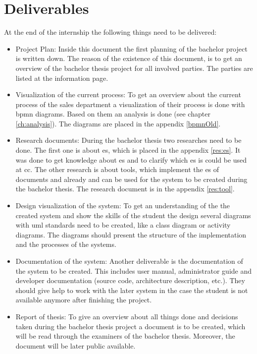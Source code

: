 \section{Deliverables}
At the end of the internship the following things need to be delivered:
\begin{itemize}
	\item Project Plan: Inside this document the first planning of the bachelor project is written down. The reason of the existence of this document, is to get an overview of the bachelor thesis project for all involved parties. The parties are listed at the information page.
	\item Visualization of the current process: To get an overview about the current process of the sales department a visualization of their process is done with \gls{bpmn} diagrams. Based on them an analysis is done (see chapter \ref{ch:analysis}). The diagrams are placed in the appendix \ref{bpmnOld}.
	\item Research documents: During the bachelor thesis two researches need to be done. The first one is about \gls{es}, which is placed in the appendix \ref{res:es}. It was done to get knowledge about \gls{es} and to clarify which \gls{es} is could be used at \gls{cc}. The other research is about tools, which implement the \gls{es} of documents and already and can be used for the system to be created during the bachelor thesis. The research document is in the appendix \ref{res:tool}.
	\item Design visualization of the system: To get an understanding of the the created system and show the skills of the student the design several diagrams with \gls{uml} standards need to be created, like a class diagram or activity diagrams. The diagrams should present the structure of the implementation and the processes of the systems.
	\item Documentation of the system: Another deliverable is the documentation of the system to be created. This includes user manual, administrator guide and developer documentation (source code, architecture description, etc.). They should give help to work with the later system in the case the student is not available anymore after finishing the project.
	\item Report of thesis: To give an overview about all things done and decisions taken during the bachelor thesis project a document is to be created, which will be read through the examiners of the bachelor thesis. Moreover, the document will be later public available.   
\end{itemize}

